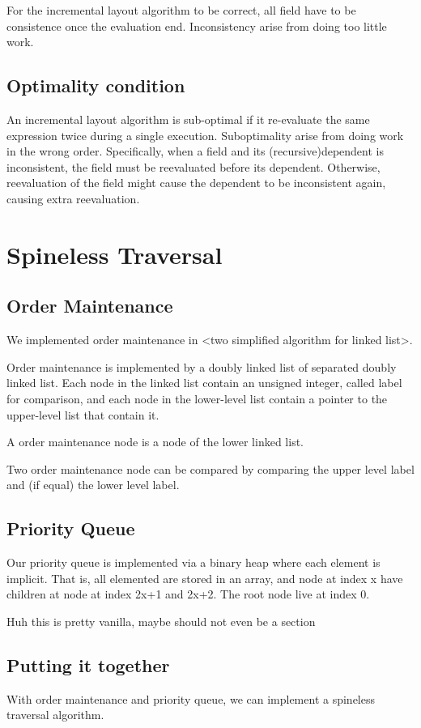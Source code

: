 \documentclass[format=acmsmall, review=false, screen=true]{acmart}
\begin{document}
For the incremental layout algorithm to be correct, all field have to be consistence once the evaluation end. Inconsistency arise from doing too little work.

\subsection{Optimality condition}
An incremental layout algorithm is sub-optimal if it re-evaluate the same expression twice during a single execution. Suboptimality arise from doing work in the wrong order. Specifically, when a field and its (recursive)dependent is inconsistent, the field must be reevaluated before its dependent. Otherwise, reevaluation of the field might cause the dependent to be inconsistent again, causing extra reevaluation.

\section{Spineless Traversal}
\subsection{Order Maintenance}
We implemented order maintenance in <two simplified algorithm for linked list>.

Order maintenance is implemented by a doubly linked list of separated doubly linked list. Each node in the linked list contain an unsigned integer, called label for comparison, and each node in the lower-level list contain a pointer to the upper-level list that contain it.

A order maintenance node is a node of the lower linked list.

Two order maintenance node can be compared by comparing the upper level label and (if equal) the lower level label.

\subsection{Priority Queue}
Our priority queue is implemented via a binary heap where each element is implicit. That is, all elemented are stored in an array, and node at index x have children at node at index 2x+1 and 2x+2. The root node live at index 0.

Huh this is pretty vanilla, maybe should not even be a section
\subsection{Putting it together}
With order maintenance and priority queue, we can implement a spineless traversal algorithm.
\end{document}
